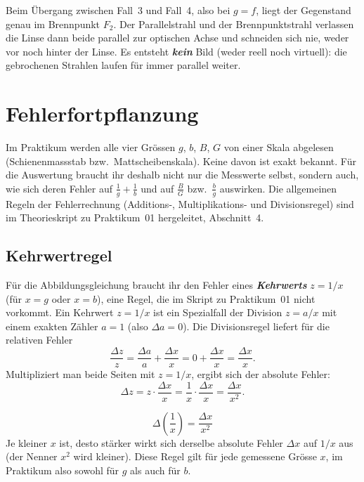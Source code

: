 \documentclass[11pt,a4paper]{article}
\begin{document}
\needspace{5cm}
\begin{achtungbox}
Beim Übergang zwischen Fall~3 und Fall~4, also bei $g=f$, liegt der Gegenstand genau im Brennpunkt $F_2$. Der Parallelstrahl und der Brennpunktstrahl verlassen die Linse dann beide parallel zur optischen Achse und schneiden sich nie, weder vor noch hinter der Linse. Es entsteht \textbf{\emph{kein}} Bild (weder reell noch virtuell): die gebrochenen Strahlen laufen für immer parallel weiter.
\end{achtungbox}

\section{Fehlerfortpflanzung}

Im Praktikum werden alle vier Grössen $g$, $b$, $B$, $G$ von einer Skala abgelesen (Schienenmassstab bzw.\ Mattscheibenskala). Keine davon ist exakt bekannt. Für die Auswertung braucht ihr deshalb nicht nur die Messwerte selbst, sondern auch, wie sich deren Fehler auf $\tfrac1g+\tfrac1b$ und auf $\tfrac{B}{G}$ bzw.\ $\tfrac{b}{g}$ auswirken. Die allgemeinen Regeln der Fehlerrechnung (Additions-, Multiplikations- und Divisionsregel) sind im Theorieskript zu Praktikum~01 hergeleitet, Abschnitt~4.

\subsection{Kehrwertregel}

Für die Abbildungsgleichung braucht ihr den Fehler eines \textbf{\emph{Kehrwerts}} $z=1/x$ (für $x=g$ oder $x=b$), eine Regel, die im Skript zu Praktikum~01 nicht vorkommt. Ein Kehrwert $z=1/x$ ist ein Spezialfall der Division $z=a/x$ mit einem exakten Zähler $a=1$ (also $\Delta a=0$). Die Divisionsregel liefert für die relativen Fehler
\[
  \frac{\Delta z}{z} = \frac{\Delta a}{a} + \frac{\Delta x}{x} = 0 + \frac{\Delta x}{x} = \frac{\Delta x}{x}.
\]
Multipliziert man beide Seiten mit $z=1/x$, ergibt sich der absolute Fehler:
\[
  \Delta z = z\cdot\frac{\Delta x}{x} = \frac{1}{x}\cdot\frac{\Delta x}{x} = \frac{\Delta x}{x^2}.
\]

\begin{tippbox}
\[
  \boxed{\Delta\!\left(\frac{1}{x}\right) = \frac{\Delta x}{x^2}}
\]
Je kleiner $x$ ist, desto stärker wirkt sich derselbe absolute Fehler $\Delta x$ auf $1/x$ aus (der Nenner $x^2$ wird kleiner). Diese Regel gilt für jede gemessene Grösse $x$, im Praktikum also sowohl für $g$ als auch für $b$.
\end{tippbox}
\end{document}
